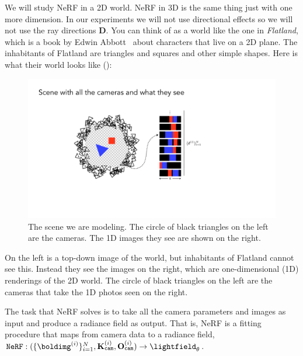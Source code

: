 We will study NeRF in a 2D world. NeRF in 3D is the same thing just with one more dimension. In our experiments we will not use directional effects so we will not use the ray directions $\mathbf{D}$. You can think of as a world like the one in \textit{Flatland}, which is a book by Edwin Abbott~\cite{abbott2009flatland} about characters that live on a 2D plane. The inhabitants of Flatland are triangles and squares and other simple shapes. Here is what their world looks like (\fig{\ref{fig:nerfs:flatland_cameras_and_images}}):
\begin{figure}[h!]
    \centerline{
    \includegraphics[width=0.65\linewidth]{figures/nerfs/flatland_cameras_and_images.pdf}
    }
    \caption{The scene we are modeling. The circle of black triangles on the left are the cameras. The 1D images they see are shown on the right.}
    \label{fig:nerfs:flatland_cameras_and_images}
\end{figure}

On the left is a top-down image of the world, but inhabitants of Flatland cannot see this. Instead they see the images on the right, which are one-dimensional (1D) renderings of the 2D world. The circle of black triangles on the left are the cameras that take the 1D photos seen on the right.


The task that NeRF solves is to take all the camera parameters and images as input and produce a radiance field as output. That is, NeRF is a fitting procedure that maps from camera data to a radiance field, $\texttt{NeRF}: (\{\boldimg^{(i)}\}_{i=1}^N, \mathbf{K}^{(i)}_{\texttt{cam}}, \mathbf{O}^{(i)}_{\texttt{cam}}) \rightarrow \lightfield_{\theta}$. 

